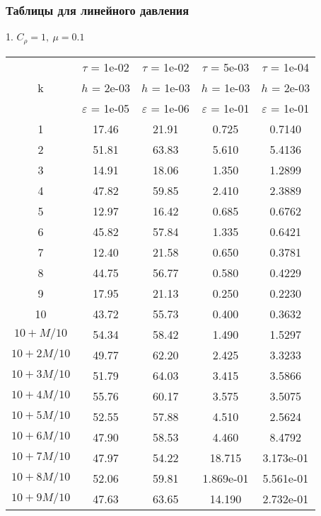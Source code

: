 \subsubsection{Таблицы для линейного давления}
1. $C_{\rho} = 1, \ \mu = 0.1$
\begin{center}
	\begin{tabular}{ |c|c|c|c|c| } 
		\hline
		  & $\tau$ = 1e-02 & $\tau$ = 1e-02 & $\tau$ = 5e-03 & $\tau$ = 1e-04 \\ 
		k & $h$ = 2e-03 & $h$ = 1e-03 & $h$ = 1e-03 & $h$ = 2e-03 \\ 
		  & $\varepsilon$ = 1e-05 & $\varepsilon$ = 1e-06 & $\varepsilon$ = 1e-01 & $\varepsilon$ = 1e-01 \\ 
		\hline
		1 & 17.46 & 21.91 & 0.725 & 0.7140 \\
		\hline
		2 & 51.81 & 63.83 & 5.610 & 5.4136 \\
		\hline
		3 & 14.91 & 18.06 & 1.350 & 1.2899 \\
		\hline
		4 & 47.82 & 59.85 & 2.410 & 2.3889 \\
		\hline
		5 & 12.97 & 16.42 & 0.685 & 0.6762 \\
		\hline
		6 & 45.82 & 57.84 & 1.335 & 0.6421 \\
		\hline
		7 & 12.40 & 21.58 & 0.650 & 0.3781 \\
		\hline
		8 & 44.75 & 56.77 & 0.580 & 0.4229 \\
		\hline
		9 & 17.95 & 21.13 & 0.250 & 0.2230 \\
		\hline
		10 & 43.72 & 55.73 & 0.400 & 0.3632 \\
		\hline
		$10 + M/10$ & 54.34 & 58.42 & 1.490 & 1.5297 \\
		\hline
		$10 + 2M/10$ & 49.77 & 62.20 & 2.425 & 3.3233 \\
		\hline
		$10 + 3M/10$ & 51.79 & 64.03 & 3.415 & 3.5866 \\
		\hline
		$10 + 4M/10$ & 55.76 & 60.17 & 3.575 & 3.5075 \\
		\hline
		$10 + 5M/10$ & 52.55 & 57.88 & 4.510 & 2.5624 \\
		\hline
		$10 + 6M/10$ & 47.90 & 58.53 & 4.460 & 8.4792 \\
		\hline
		$10 + 7M/10$ & 47.97 & 54.22 & 18.715 & 3.173e-01 \\
		\hline
		$10 + 8M/10$ & 52.06 & 59.81 & 1.869e-01 & 5.561e-01 \\
		\hline
		$10 + 9M/10$ & 47.63 & 63.65 & 14.190 & 2.732e-01 \\
		\hline
	\end{tabular}
\end{center}

